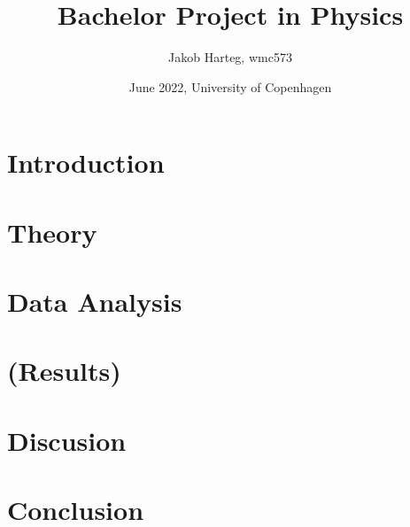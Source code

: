 \documentclass{article}
\title{Bachelor Project in Physics}
\author{Jakob Harteg, wmc573}
\date{June 2022, University of Copenhagen}
\begin{document}
\maketitle


\newpage


\section{Introduction}
 

\section{Theory}
 

\section{Data Analysis}
 

\section{(Results)}
%  

\section{Discusion}
%  

\section{Conclusion}
%  

\newpage
\nocite{*}


\end{document}
